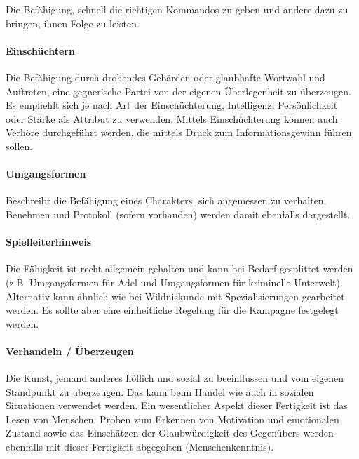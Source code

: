 \documentclass{article}
\begin{document}
Die Befähigung, schnell die richtigen Kommandos zu geben und andere dazu zu bringen, ihnen Folge zu leisten.

\paragraph{Einschüchtern}

Die Befähigung durch drohendes Gebärden oder glaubhafte Wortwahl und Auftreten, eine gegnerische Partei von der
eigenen Überlegenheit zu überzeugen. Es empfiehlt sich je nach Art der Einschüchterung, Intelligenz, Persönlichkeit
oder Stärke als Attribut zu verwenden. Mittels Einschüchterung können auch Verhöre durchgeführt werden, die mittels
Druck zum Informationsgewinn führen sollen.

\paragraph{Umgangsformen}

Beschreibt die Befähigung eines Charakters, sich angemessen zu verhalten. Benehmen und Protokoll (sofern vorhanden)
werden damit ebenfalls dargestellt.

\begin{mdframed}[hidealllines=true, backgroundcolor=black!10]
\paragraph{Spielleiterhinweis}

Die Fähigkeit ist recht allgemein gehalten und kann bei Bedarf gesplittet werden (z.B. Umgangsformen für Adel und
Umgangsformen für kriminelle Unterwelt). Alternativ kann ähnlich wie bei Wildniskunde mit Spezialisierungen gearbeitet
werden. Es sollte aber eine einheitliche Regelung für die Kampagne festgelegt werden.

\end{mdframed}
\paragraph{Verhandeln / Überzeugen}

Die Kunst, jemand anderes höflich und sozial zu beeinflussen und vom eigenen Standpunkt zu überzeugen. Das kann beim
Handel wie auch in sozialen Situationen verwendet werden. Ein wesentlicher Aspekt dieser Fertigkeit ist das Lesen von
Menschen. Proben zum Erkennen von Motivation und emotionalen Zustand sowie das Einschätzen der Glaubwürdigkeit des
Gegenübers werden ebenfalls mit dieser Fertigkeit abgegolten (Menschenkenntnis).
\end{document}
